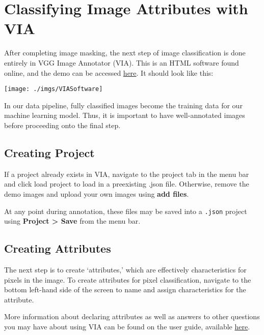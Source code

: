 \documentclass[
]{article}
\begin{document}
\hypertarget{classifying-image-attributes-with-via}{%
\section{Classifying Image Attributes with VIA}\label{classifying-image-attributes-with-via}}

After completing image masking, the next step of image classification is done entirely in VGG Image Annotator (VIA).
This is an HTML software found online, and the demo can be accessed \href{https://www.robots.ox.ac.uk/~vgg/software/via/via_demo.html}{here}. It should look like this:

\texttt{[image: ./imgs/VIASoftware]}

In our data pipeline, fully classified images become the training data for our machine learning model. Thus, it is important to have well-annotated images before proceeding onto the final step.

\hypertarget{creating-project}{%
\subsection{Creating Project}\label{creating-project}}

If a project already exists in VIA, navigate to the project tab in the menu bar and click
load project to load in a preexisting .json file. Otherwise, remove the demo images
and upload your own images using \textbf{add files}.

At any point during annotation, these files may be saved into a \texttt{.json} project using
\textbf{Project \textgreater{} Save} from the menu bar.

\hypertarget{creating-attributes}{%
\subsection{Creating Attributes}\label{creating-attributes}}

The next step is to create `attributes,' which are effectively characteristics for pixels
in the image. To create attributes for pixel classification, navigate to the bottom left-hand side
of the screen to name and assign characteristics for the attribute.

More information about declaring attributes as well as answers to other questions you may have about
using VIA can be found on the user guide, available \href{https://www.robots.ox.ac.uk/~vgg/software/via/docs/user_guide.html}{here}.
\end{document}
